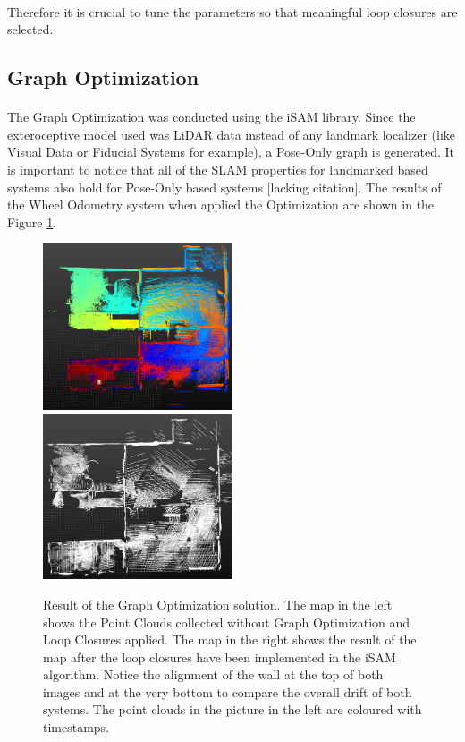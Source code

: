 \documentclass[11pt]{article}
\begin{document}
	\paragraph{}
	Therefore it is crucial to tune the parameters so that meaningful loop closures are selected. 

	\subsection{Graph Optimization}
	\paragraph{}
	The Graph Optimization was conducted using the iSAM library. Since the exteroceptive model used was LiDAR data instead of any landmark localizer (like Visual Data or Fiducial Systems for example), a Pose-Only graph is generated. It is important to notice that all of the SLAM properties for landmarked based systems also hold for Pose-Only based systems [lacking citation].
	The results of the Wheel Odometry system when applied the Optimization are shown in the Figure \ref{fig:GraphOptimization1}.
		
	\begin{figure}[h]
		\includegraphics[width=0.5\textwidth]{ResultNoLoopClosure}
		\includegraphics[width=0.5\textwidth]{ResultLoopClosure}
		\caption{Result of the Graph Optimization solution. The map in the left shows the Point Clouds collected without Graph Optimization and Loop Closures applied. The map in the right shows the result of the map after the loop closures have been implemented in the iSAM algorithm. Notice the alignment of the wall at the top of both images and at the very bottom to compare the overall drift of both systems. The point clouds in the picture in the left are coloured with timestamps.}
		\label{fig:GraphOptimization1}	
	\end{figure}
	
\end{document}
